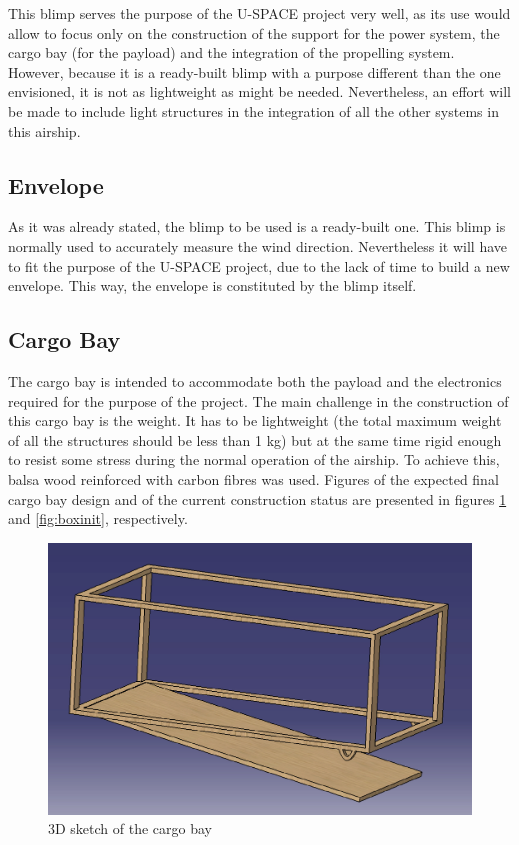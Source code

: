 \noindent
This blimp serves the purpose of the U-SPACE project very well, as its use would allow to focus only on the construction of the support for the power system, the cargo bay (for the payload) and the integration of the propelling system. However, because it is a ready-built blimp with a purpose different than the one envisioned, it is not as lightweight as might be needed. Nevertheless, an effort will be made to include light structures in the integration of all the other systems in this airship.

\subsection{Envelope}

As it was already stated, the blimp to be used is a ready-built one. This blimp is normally used to accurately measure the wind direction. Nevertheless it will have to fit the purpose of the U-SPACE project, due to the lack of time to build a new envelope. This way, the envelope is constituted by the blimp itself.  

\subsection{Cargo Bay}

The cargo bay is intended to accommodate both the payload and the electronics required for the purpose of the project. The main challenge in the construction of this cargo bay is the weight. It has to be lightweight (the total maximum weight of all the structures should be less than 1 kg) but at the same time rigid enough to resist some stress during the normal operation of the airship. To achieve this, balsa wood reinforced with carbon fibres was used. Figures of the expected final cargo bay design and of the current construction status are presented in figures \ref{fig:box} and \ref{fig:boxinit}, respectively. 

\begin{figure}[th!]
\centering
\includegraphics[scale=0.5]{figures/box.png}
\caption{3D sketch of the cargo bay} 
\label{fig:box}
\end{figure}

